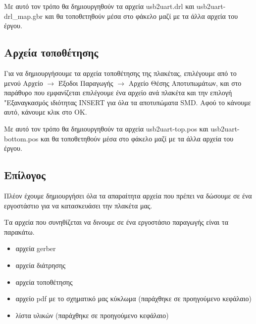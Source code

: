 \documentclass[a4paper]{article}
\begin{document}
\begin{figure}
  \begin{center}
    \label{fig:kicad-main}
  \end{center}
\end{figure}

Με αυτό τον τρόπο θα δημιουργηθούν τα αρχεία usb2uart.drl και usb2uart-drl\_map.gbr και θα τοποθετηθούν μέσα στο φάκελο μαζί με τα άλλα αρχεία του έργου.

\subsection{Αρχεία τοποθέτησης}
Για να δημιουργήσουμε τα αρχεία τοποθέτησης της πλακέτας, επιλέγουμε από το μενού Αρχείο $\rightarrow$ Έξοδοι Παραγωγής $\rightarrow$ Αρχείο Θέσης Αποτυπωμάτων, και στο παράθυρο που εμφανίζεται επιλέγουμε ένα αρχείο ανά πλακέτα και την επιλογή "Εξαναγκασμός ιδιότητας INSERT για όλα τα αποτυπώματα SMD. Αφού το κάνουμε αυτό, κάνουμε κλικ στο OK.

Με αυτό τον τρόπο θα δημιουργηθούν τα αρχεία usb2uart-top.pos και usb2uart-bottom.pos και θα τοποθετηθούν μέσα στο φάκελο μαζί με τα άλλα αρχεία του έργου.

\subsection{Επίλογος}
Πλέον έχουμε δημιουργήσει όλα τα απαραίτητα αρχεία που πρέπει να δώσουμε σε ένα εργοστάστιο για να κατασκευάσει την πλακέτα μας.

Τα αρχεία που συνηθίζεται να δινουμε σε ένα εργοστάσιο παραγωγής είναι τα παρακάτω.

\begin{itemize}
    \item αρχεία gerber
    \item αρχεία διάτρησης
    \item αρχεία τοποθέτησης
    \item αρχείο pdf με το σχηματικό μας κύκλωμα (παράχθηκε σε προηγούμενο κεφάλαιο)
    \item λίστα υλικών (παράχθηκε σε προηγούμενο κεφάλαιο)
\end{itemize}


  
\end{document}
